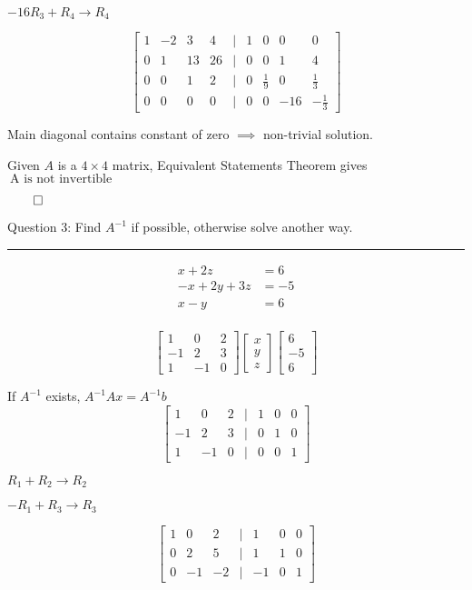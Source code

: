 \documentclass[a4paper,11pt,twoside]{report}
\begin{document}
$-16R_3 + R_4 \to R_4$

\[\begin{bmatrix} 1 & -2 & 3 & 4 & | & 1 & 0 & 0 & 0 \\ 0 & 1 & 13 & 26 & | & 0 & 0 & 1 & 4\\
0 & 0 & 1 & 2 & | & 0 & \frac{1}{9} & 0 & \frac{1}{3} \\0 & 0 & 0 & 0 & | & 0 & 0 & -16 & -\frac{1}{3}\end{bmatrix} \]

Main diagonal contains constant of zero $\implies$ non-trivial solution.

Given $A$ is a $4\times 4$ matrix, Equivalent Statements Theorem gives $\boxed{\:\text{A is not invertible}\:}$

$\qed$


\noindent Question 3: Find $A^{-1}$ if possible, otherwise solve another way. \\ \hrule
\begin{align*}
	x + 2z &= 6 \\
	-x + 2y + 3z &=  -5 \\
	x - y &= 6 \\
\end{align*}

\[\begin{bmatrix} 1 & 0 & 2 \\ -1 & 2 & 3 \\ 1 & -1 & 0 \end{bmatrix}
\begin{bmatrix} x \\ y \\ z \end{bmatrix}
\begin{bmatrix} 6 \\ -5 \\ 6 \end{bmatrix} \]

If $A^{-1}$ exists, $A^{-1}Ax = A^{-1}b$
\[\begin{bmatrix}  1 & 0 & 2 & | & 1 & 0 & 0 \\ -1 & 2 & 3 & | & 0 & 1 & 0 \\ 1 & -1 & 0 & | & 0 & 0 & 1  \end{bmatrix} \]

$R_1 + R_2 \to R_2$

$-R_1 + R_3 \to R_3$

\[\begin{bmatrix}  1 & 0 & 2 & | & 1 & 0 & 0 \\ 0 & 2 & 5 & | & 1 & 1 & 0 \\ 0 & -1 & -2 & | & -1 & 0 & 1  \end{bmatrix} \]
\end{document}
